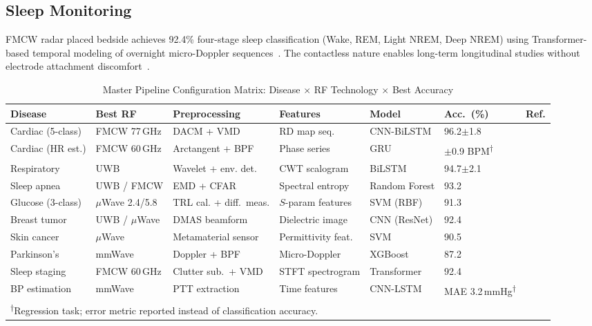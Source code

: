 \documentclass[journal,twoside]{IEEEtran}
\begin{document}
\subsection{Sleep Monitoring}
FMCW radar placed bedside achieves 92.4\% four-stage sleep classification (Wake, REM, Light NREM, Deep NREM) using Transformer-based temporal modeling of overnight micro-Doppler sequences~\cite{ref_mlrf_sensing2025}. The contactless nature enables long-term longitudinal studies without electrode attachment discomfort~\cite{ref_eeg_sleep2023}.


\begin{table}[!t]
\centering
\caption{Master Pipeline Configuration Matrix: Disease $\times$ RF Technology $\times$ Best Accuracy}
\label{tab:master_matrix}
\small
\begin{tabular}{@{}llllllc@{}}
\toprule
\textbf{Disease} & \textbf{Best RF} & \textbf{Preprocessing} & \textbf{Features} & \textbf{Model} & \textbf{Acc.\ (\%)} & \textbf{Ref.} \\
\midrule
Cardiac (5-class) & FMCW 77\,GHz & DACM + VMD & RD map seq. & CNN-BiLSTM & 96.2$\pm$1.8 & \cite{ref_multiscenario_mimo2025} \\
Cardiac (HR est.) & FMCW 60\,GHz & Arctangent + BPF & Phase series & GRU & $\pm$0.9 BPM\textsuperscript{$\dagger$} & \cite{ref_fmcw_contactless2025} \\
Respiratory & UWB & Wavelet + env. det. & CWT scalogram & BiLSTM & 94.7$\pm$2.1 & \cite{ref_uwb_overview2024} \\
Sleep apnea & UWB / FMCW & EMD + CFAR & Spectral entropy & Random Forest & 93.2 & \cite{ref_infant_monitor2025} \\
Glucose (3-class) & $\mu$Wave 2.4/5.8 & TRL cal. + diff.\ meas. & $S$-param features & SVM (RBF) & 91.3 & \cite{ref_noninvasive_glucose2025} \\
Breast tumor & UWB / $\mu$Wave & DMAS beamform & Dielectric image & CNN (ResNet) & 92.4 & \cite{ref_uwb_breast2024} \\
Skin cancer & $\mu$Wave & Metamaterial sensor & Permittivity feat. & SVM & 90.5 & \cite{ref_metamaterial_cancer2024} \\
Parkinson's & mmWave & Doppler + BPF & Micro-Doppler & XGBoost & 87.2 & \cite{ref_parkinson_wearable2023} \\
Sleep staging & FMCW 60\,GHz & Clutter sub.\ + VMD & STFT spectrogram & Transformer & 92.4 & \cite{ref_mlrf_sensing2025} \\
BP estimation & mmWave & PTT extraction & Time features & CNN-LSTM & MAE 3.2\,mmHg\textsuperscript{$\dagger$} & \cite{ref_wearable_bp_ml2025} \\
\bottomrule
\multicolumn{7}{l}{\textsuperscript{$\dagger$}Regression task; error metric reported instead of classification accuracy.}
\end{tabular}
\end{table}
\end{document}
